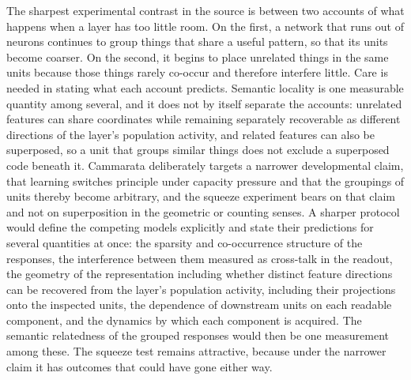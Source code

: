 \documentclass[11pt]{article}
\begin{document}
The sharpest experimental contrast in the source is between two accounts of what happens when a layer has too little room. On the first, a network that runs out of neurons continues to group things that share a useful pattern, so that its units become coarser. On the second, it begins to place unrelated things in the same units because those things rarely co-occur and therefore interfere little. Care is needed in stating what each account predicts. Semantic locality is one measurable quantity among several, and it does not by itself separate the accounts: unrelated features can share coordinates while remaining separately recoverable as different directions of the layer's population activity, and related features can also be superposed, so a unit that groups similar things does not exclude a superposed code beneath it. Cammarata deliberately targets a narrower developmental claim, that learning switches principle under capacity pressure and that the groupings of units thereby become arbitrary, and the squeeze experiment bears on that claim and not on superposition in the geometric or counting senses. A sharper protocol would define the competing models explicitly and state their predictions for several quantities at once: the sparsity and co-occurrence structure of the responses, the interference between them measured as cross-talk in the readout, the geometry of the representation including whether distinct feature directions can be recovered from the layer's population activity, including their projections onto the inspected units, the dependence of downstream units on each readable component, and the dynamics by which each component is acquired. The semantic relatedness of the grouped responses would then be one measurement among these. The squeeze test remains attractive, because under the narrower claim it has outcomes that could have gone either way.
\end{document}
